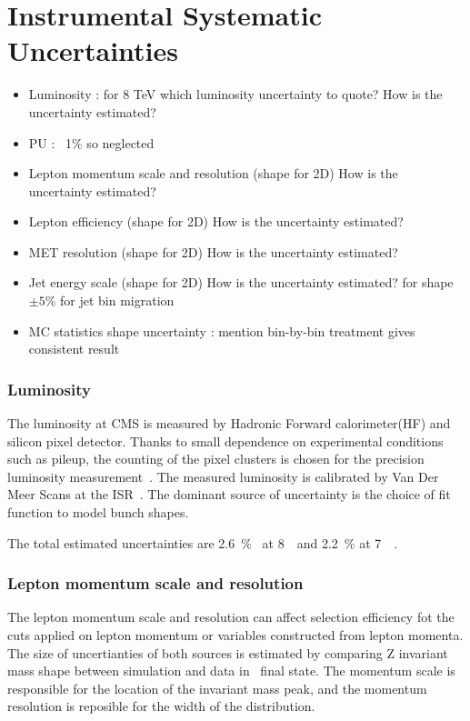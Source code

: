 \section{Instrumental Systematic Uncertainties} 
\begin{itemize} 
\item Luminosity : for 8 TeV which luminosity uncertainty to quote? %
      How is the uncertainty estimated?
\item PU : ~1\% so neglected    
\item Lepton momentum scale and resolution (shape for 2D) 
      How is the uncertainty estimated?
\item Lepton efficiency (shape for 2D)    
      How is the uncertainty estimated?
\item MET resolution (shape for 2D)    
      How is the uncertainty estimated?
\item Jet energy scale (shape for 2D)     
      How is the uncertainty estimated? for shape $\pm5\%$ for jet bin migration 
\item  MC statistics shape uncertainty : mention bin-by-bin treatment gives consistent result  
\end{itemize} 


\subsubsection{Luminosity}

The luminosity at CMS is measured by Hadronic Forward calorimeter(HF)
and silicon pixel detector. Thanks to small dependence on experimental 
conditions such as pileup, the counting of the pixel clusters is chosen 
for the precision luminosity measurement~\cite{CMS-PAS-LUM-13-001}. 
The measured luminosity is calibrated by Van Der Meer Scans at the ISR~\cite{CMS-PAS-LUM-13-001}.
The dominant source of uncertainty is the choice of fit function 
to model bunch shapes.  

The total estimated uncertainties are 2.6~\%~\cite{CMS-PAS-LUM-13-001} at 8~\TeV\ 
and 2.2~\% at 7~\TeV~\cite{}.  

\subsubsection{Lepton momentum scale and resolution}

The lepton momentum scale and resolution can affect selection efficiency 
fot the cuts applied on lepton momentum or variables constructed from 
lepton momenta. The size of uncertianties of both sources is estimated 
by comparing Z invariant mass shape between simulation and data in \SF\ 
final state. The momentum scale is responsible for the location of the 
invariant mass peak, and the momentum resolution is reposible for the width 
of the distribution. 

